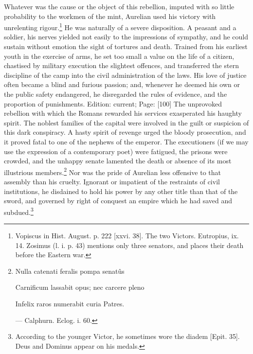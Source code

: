 Whatever was the cause or the object of this rebellion, imputed with so little probability to the workmen of the mint, Aurelian used his victory with unrelenting rigour.\footnote{Vopiscus in Hist. August. p. 222 [xxvi. 38]. The two Victors. Eutropius, ix. 14. Zosimus (l. i. p. 43) mentions only three senators, and places their death before the Eastern war.} He was naturally of a severe disposition. A peasant and a soldier, his nerves yielded not easily to the impressions of sympathy, and he could sustain without emotion the sight of tortures and death. Trained from his earliest youth in the exercise of arms, he set too small a value on the life of a citizen, chastised by military execution the slightest offences, and transferred the stern discipline of the camp into the civil administration of the laws. His love of justice often became a blind and furious passion; and, whenever he deemed his own or the public safety endangered, he disregarded the rules of evidence, and the proportion of punishments. Edition: current; Page: [100] The unprovoked rebellion with which the Romans rewarded his services exasperated his haughty spirit. The noblest families of the capital were involved in the guilt or suspicion of this dark conspiracy. A hasty spirit of revenge urged the bloody prosecution, and it proved fatal to one of the nephews of the emperor. The executioners (if we may use the expression of a contemporary poet) were fatigued, the prisons were crowded, and the unhappy senate lamented the death or absence of its most illustrious members.\footnote{Nulla catenati feralis pompa senatûs

Carnificum lassabit opus; nec carcere pleno

Infelix raros numerabit curia Patres.

\texthebrew{—} Calphurn. Eclog. i. 60.} Nor was the pride of Aurelian less offensive to that assembly than his cruelty. Ignorant or impatient of the restraints of civil institutions, he disdained to hold his power by any other title than that of the sword, and governed by right of conquest an empire which he had saved and subdued.\footnote{According to the younger Victor, he sometimes wore the diadem [Epit. 35]. Deus and Dominus appear on his medals.}

